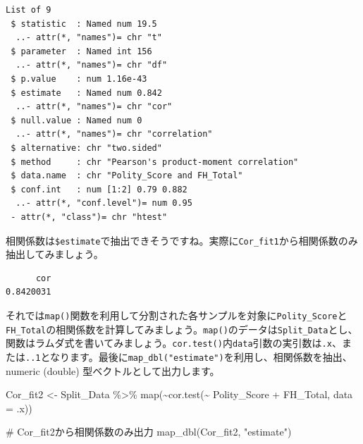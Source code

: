 \documentclass[
  a4paper,
  pandoc,
  ja=standard,
  jafont=haranoaji]{bxjsbook}
\newenvironment{Shaded}{\begin{snugshade}}{\end{snugshade}}
\newcommand{\AttributeTok}[1]{\textcolor[rgb]{0.00,0.48,0.65}{#1}}
\newcommand{\CommentTok}[1]{\textcolor[rgb]{0.37,0.37,0.37}{#1}}
\newcommand{\FunctionTok}[1]{\textcolor[rgb]{0.28,0.35,0.67}{#1}}
\newcommand{\NormalTok}[1]{\textcolor[rgb]{0.00,0.48,0.65}{#1}}
\newcommand{\OtherTok}[1]{\textcolor[rgb]{0.00,0.48,0.65}{#1}}
\newcommand{\SpecialCharTok}[1]{\textcolor[rgb]{0.37,0.37,0.37}{#1}}
\newcommand{\StringTok}[1]{\textcolor[rgb]{0.13,0.47,0.30}{#1}}
\begin{document}
\begin{verbatim}
List of 9
 $ statistic  : Named num 19.5
  ..- attr(*, "names")= chr "t"
 $ parameter  : Named int 156
  ..- attr(*, "names")= chr "df"
 $ p.value    : num 1.16e-43
 $ estimate   : Named num 0.842
  ..- attr(*, "names")= chr "cor"
 $ null.value : Named num 0
  ..- attr(*, "names")= chr "correlation"
 $ alternative: chr "two.sided"
 $ method     : chr "Pearson's product-moment correlation"
 $ data.name  : chr "Polity_Score and FH_Total"
 $ conf.int   : num [1:2] 0.79 0.882
  ..- attr(*, "conf.level")= num 0.95
 - attr(*, "class")= chr "htest"
\end{verbatim}

相関係数は\texttt{\$estimate}で抽出できそうですね。実際に\texttt{Cor\_fit1}から相関係数のみ抽出してみましょう。

\begin{Shaded}
\end{Shaded}

\begin{verbatim}
      cor 
0.8420031 
\end{verbatim}

それでは\texttt{map()}関数を利用して分割された各サンプルを対象に\texttt{Polity\_Score}と\texttt{FH\_Total}の相関係数を計算してみましょう。\texttt{map()}のデータは\texttt{Split\_Data}とし、関数はラムダ式を書いてみましょう。\texttt{cor.test()}内\texttt{data}引数の実引数は\texttt{.x}、または\texttt{..1}となります。最後に\texttt{map\_dbl("estimate")}を利用し、相関係数を抽出、numeric
(double) 型ベクトルとして出力します。

\begin{Shaded}
\begin{Highlighting}[numbers=left,,]
\NormalTok{Cor\_fit2 }\OtherTok{\textless{}{-}}\NormalTok{ Split\_Data }\SpecialCharTok{\%\textgreater{}\%}
  \FunctionTok{map}\NormalTok{(}\SpecialCharTok{\textasciitilde{}}\FunctionTok{cor.test}\NormalTok{(}\SpecialCharTok{\textasciitilde{}}\NormalTok{ Polity\_Score }\SpecialCharTok{+}\NormalTok{ FH\_Total, }\AttributeTok{data =}\NormalTok{ .x))}
\end{Highlighting}
\end{Shaded}

\begin{Shaded}
\begin{Highlighting}[numbers=left,,]
\CommentTok{\# Cor\_fit2から相関係数のみ出力}
\FunctionTok{map\_dbl}\NormalTok{(Cor\_fit2, }\StringTok{"estimate"}\NormalTok{)}
\end{Highlighting}
\end{Shaded}
\end{document}
